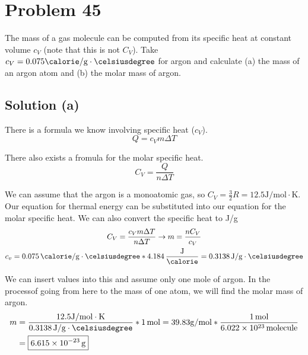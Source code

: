 \documentclass[12pt]{article}
\newcommand{\E}[1]{\times 10^{#1}}
\begin{document}
    \pagebreak
    \section{Problem 45}
        The mass of a gas molecule can be computed from its specific heat at constant volume $c_V$ (note that this is not $C_V$). 
        Take $c_V = 0.075 \unit{\calorie/\gram\cdot\celsiusdegree}$ for argon and calculate (a) the mass of an argon atom and (b) the molar mass of argon.

        \subsection{Solution (a)}
            There is a formula we know involving specific heat ($c_V$).
            \begin{equation}
                Q = c_V m \Delta T
            \end{equation}

            There also exists a fromula for the molar specific heat.
            \begin{equation}
                C_V = \frac{Q}{n\Delta T}
            \end{equation}

            We can assume that the argon is a monoatomic gas, so $C_V = \frac{3}{2}R = 12.5\unit{\joule/\mole\cdot\kelvin}$.
            Our equation for thermal energy can be substituted into our equation for the molar specific heat.
            We can also convert the specific heat to \unit{\joule/\gram\cdot\celsiusdegree}
            \begin{gather}
                C_V =   \frac{c_V m \Delta T}{n \Delta T} \to
                m   =   \frac{n C_V}{c_V}\\
                c_v =   0.075\,\unit{\calorie/\gram\cdot\celsiusdegree} * 4.184\,\unit{\frac{\joule}{\calorie}}
                    =   0.3138\,\unit{\joule/\gram\cdot\celsiusdegree}
            \end{gather}

            We can insert values into this and assume only one mole of argon.
            In the processof going from here to the mass of one atom, we will find the molar mass of argon.
            \begin{align}
                m   &=  \frac{12.5\unit{\joule/\mole\cdot\kelvin}}{0.3138\,\unit{\joule/\gram\cdot\celsiusdegree}} * 1\,\unit{\mole}
                    =   39.83\unit{\gram/\mole} * \frac{1\,\unit{\mole}}{6.022\E{23}\,\text{molecule}}\\
                    &=  \boxed{6.615\E{-23}\,\unit{\gram}}
            \end{align}
\end{document}
